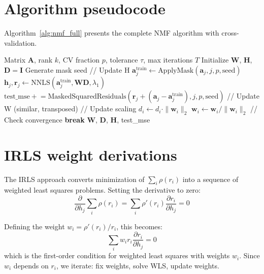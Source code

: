 \documentclass[article]{jss_modified}
\begin{document}
\begin{appendix}

\section{Algorithm pseudocode} \label{app:pseudocode}

Algorithm~\ref{alg:nmf_full} presents the complete NMF algorithm with 
cross-validation.

\begin{algorithm}[h]
\caption{NMF with cross-validation}
\label{alg:nmf_full}
\begin{algorithmic}[1]
\Require Matrix $\mathbf{A}$, rank $k$, CV fraction $p$, tolerance $\tau$, 
max iterations $T$
\State Initialize $\mathbf{W}$, $\mathbf{H}$, $\mathbf{D} = \mathbf{I}$
\State Generate mask seed
  \State // Update H
    \State $\mathbf{a}_j^{\text{train}} \leftarrow \text{ApplyMask}(\mathbf{a}_j, j, p, \text{seed})$
    \State $\mathbf{h}_j, \mathbf{r}_j \leftarrow \text{NNLS}(\mathbf{a}_j^{\text{train}}, 
    \mathbf{WD}, \lambda_1)$
    \State $\text{test\_mse} \mathrel{+}= \text{MaskedSquaredResiduals}(\mathbf{r}_j + 
    (\mathbf{a}_j - \mathbf{a}_j^{\text{train}}), j, p, \text{seed})$
  \EndFor
  \State // Update W (similar, transposed)
  \State // Update scaling
    \State $d_i \leftarrow d_i \cdot \|\mathbf{w}_i\|_2$
    \State $\mathbf{w}_i \leftarrow \mathbf{w}_i / \|\mathbf{w}_i\|_2$
  \EndFor
  \State // Check convergence
    \State \textbf{break}
  \EndIf
\EndFor
\State \Return $\mathbf{W}$, $\mathbf{D}$, $\mathbf{H}$, test\_mse
\end{algorithmic}
\end{algorithm}

\section{IRLS weight derivations} \label{app:irls}

The IRLS approach converts minimization of $\sum_i \rho(r_i)$ into a sequence 
of weighted least squares problems. Setting the derivative to zero:
\[
\frac{\partial}{\partial h_j} \sum_i \rho(r_i) = 
\sum_i \rho'(r_i) \frac{\partial r_i}{\partial h_j} = 0
\]

Defining the weight $w_i = \rho'(r_i)/r_i$, this becomes:
\[
\sum_i w_i r_i \frac{\partial r_i}{\partial h_j} = 0
\]
which is the first-order condition for weighted least squares with weights 
$w_i$. Since $w_i$ depends on $r_i$, we iterate: fix weights, solve WLS, 
update weights.


\end{appendix}
\end{document}
